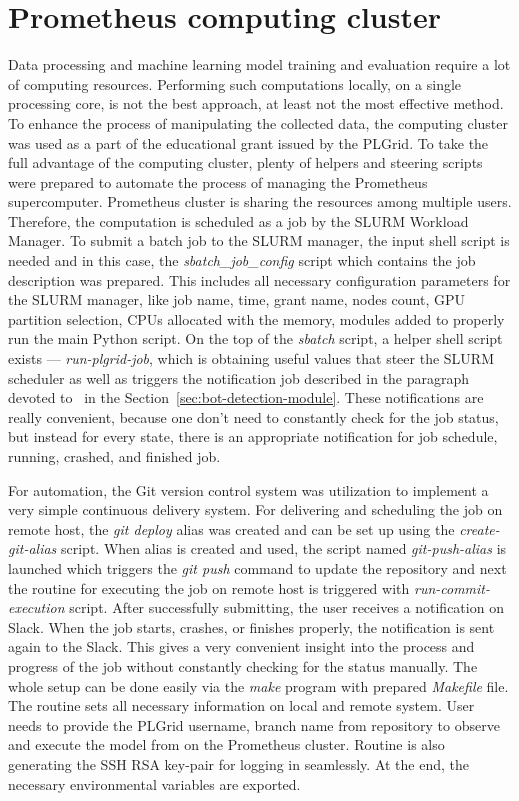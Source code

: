 \section{Prometheus computing cluster}\label{sec:prometheus-computing-cluster}
Data processing and machine learning model training and evaluation require a lot of computing resources.
Performing such computations locally, on a single processing core, is not the best approach, at least not the most effective method.
To enhance the process of manipulating the collected data, the computing cluster was used as a part of the educational grant issued by the PLGrid.
To take the full advantage of the computing cluster, plenty of helpers and steering scripts were prepared to automate the process of managing the Prometheus supercomputer.
Prometheus cluster is sharing the resources among multiple users.
Therefore, the computation is scheduled as a job by the SLURM Workload Manager.
To submit a batch job to the SLURM manager, the input shell script is needed and in this case, the \textit{sbatch\_job\_config} script which contains the job description was prepared.
This includes all necessary configuration parameters for the SLURM manager, like job name, time, grant name, nodes count, GPU partition selection, CPUs allocated with the memory, modules added to properly run the main Python script.
On the top of the \textit{sbatch} script, a helper shell script exists --- \textit{run-plgrid-job}, which is obtaining useful values that steer the SLURM scheduler as well as triggers the notification job described in the paragraph devoted to~ in the Section~\ref{sec:bot-detection-module}.
These notifications are really convenient, because one don't need to constantly check for the job status, but instead for every state, there is an appropriate notification for job schedule, running, crashed, and finished job.


For automation, the Git version control system was utilization to implement a very simple continuous delivery system.
For delivering and scheduling the job on remote host, the \textit{git deploy} alias was created and can be set up using the \textit{create-git-alias} script.
When alias is created and used, the script named \textit{git-push-alias} is launched which triggers the \textit{git push} command to update the repository and next the routine for executing the job on remote host is triggered with \textit{run-commit-execution} script.
After successfully submitting, the user receives a notification on Slack.
When the job starts, crashes, or finishes properly, the notification is sent again to the Slack.
This gives a very convenient insight into the process and progress of the job without constantly checking for the status manually.
The whole setup can be done easily via the \textit{make} program with prepared \textit{Makefile} file.
The routine sets all necessary information on local and remote system.
User needs to provide the PLGrid username, branch name from repository to observe and execute the model from on the Prometheus cluster.
Routine is also generating the SSH RSA key-pair for logging in seamlessly.
At the end, the necessary environmental variables are exported.
